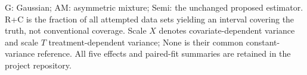 \noindent G: Gaussian; AM: asymmetric mixture; Semi: the unchanged proposed estimator. R+C is the fraction of all attempted data sets yielding an interval covering the truth, not conventional coverage. Scale $X$ denotes covariate-dependent variance and scale $T$ treatment-dependent variance; None is their common constant-variance reference. All five effects and paired-fit summaries are retained in the project repository.
\endgroup
